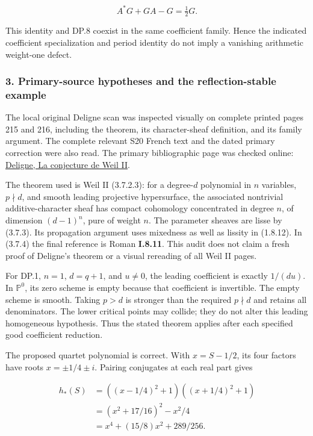 \[
A^*G+GA-G=\tfrac12G.
\tag{DP.10}
\]

This identity and DP.8 coexist in the same coefficient family. Hence the indicated coefficient specialization and period identity do not imply a vanishing arithmetic weight-one defect.

\subsubsection{3. Primary-source hypotheses and the reflection-stable example}\label{endpoint-purity_review--primary-source-hypotheses-and-the-reflection-stable-example}

The local original Deligne scan was inspected visually on complete printed pages 215 and 216, including the theorem, its character-sheaf definition, and its family argument. The complete relevant S20 French text and the dated primary correction were also read. The primary bibliographic page was checked online: \href{https://www.numdam.org/item/PMIHES_1980__52__137_0/}{Deligne, La conjecture de Weil II}.

The theorem used is Weil II (3.7.2.3): for a degree-\(d\) polynomial in \(n\) variables, \(p\nmid d\), and smooth leading projective hypersurface, the associated nontrivial additive-character sheaf has compact cohomology concentrated in degree \(n\), of dimension \((d-1)^n\), pure of weight \(n\). The parameter sheaves are lisse by (3.7.3). Its propagation argument uses mixedness as well as lissity in (1.8.12). In (3.7.4) the final reference is Roman \textbf{I.8.11}. This audit does not claim a fresh proof of Deligne's theorem or a visual rereading of all Weil II pages.

For DP.1, \(n=1\), \(d=q+1\), and \(u\ne0\), the leading coefficient is exactly \(1/(du)\). In \(\mathbb P^0\), its zero scheme is empty because that coefficient is invertible. The empty scheme is smooth. Taking \(p>d\) is stronger than the required \(p\nmid d\) and retains all denominators. The lower critical points may collide; they do not alter this leading homogeneous hypothesis. Thus the stated theorem applies after each specified good coefficient reduction.

The proposed quartet polynomial is correct. With \(x=S-1/2\), its four factors have roots \(x=\pm1/4\pm i\). Pairing conjugates at each real part gives

\[
\begin{aligned}
h_*(S)
&=((x-1/4)^2+1)((x+1/4)^2+1)\\
&=(x^2+17/16)^2-x^2/4\\
&=x^4+(15/8)x^2+289/256.
\end{aligned}
\tag{DP.11}
\]

